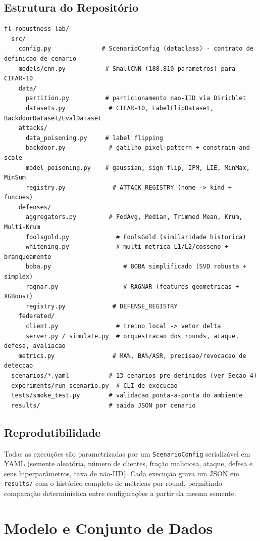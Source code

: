 \documentclass[11pt,a4paper]{article}
\begin{document}
\subsection{Estrutura do Repositório}
\begin{lstlisting}
fl-robustness-lab/
  src/
    config.py              # ScenarioConfig (dataclass) - contrato de definicao de cenario
    models/cnn.py           # SmallCNN (188.810 parametros) para CIFAR-10
    data/
      partition.py          # particionamento nao-IID via Dirichlet
      datasets.py            # CIFAR-10, LabelFlipDataset, BackdoorDataset/EvalDataset
    attacks/
      data_poisoning.py     # label flipping
      backdoor.py            # gatilho pixel-pattern + constrain-and-scale
      model_poisoning.py    # gaussian, sign flip, IPM, LIE, MinMax, MinSum
      registry.py             # ATTACK_REGISTRY (nome -> kind + funcoes)
    defenses/
      aggregators.py         # FedAvg, Median, Trimmed Mean, Krum, Multi-Krum
      foolsgold.py             # FoolsGold (similaridade historica)
      whitening.py             # multi-metrica L1/L2/cosseno + branqueamento
      boba.py                    # BOBA simplificado (SVD robusta + simplex)
      ragnar.py                  # RAGNAR (features geometricas + XGBoost)
      registry.py             # DEFENSE_REGISTRY
    federated/
      client.py                # treino local -> vetor delta
      server.py / simulate.py  # orquestracao dos rounds, ataque, defesa, avaliacao
    metrics.py                # MA%, BA%/ASR, precisao/revocacao de deteccao
  scenarios/*.yaml           # 13 cenarios pre-definidos (ver Secao 4)
  experiments/run_scenario.py  # CLI de execucao
  tests/smoke_test.py        # validacao ponta-a-ponta do ambiente
  results/                   # saida JSON por cenario
\end{lstlisting}

\subsection{Reprodutibilidade}
Todas as execuções são parametrizadas por um \texttt{ScenarioConfig} serializável em YAML (semente
aleatória, número de clientes, fração maliciosa, ataque, defesa e seus hiperparâmetros, taxa de
não-IID). Cada execução grava um JSON em \texttt{results/} com o histórico completo de métricas por
round, permitindo comparação determinística entre configurações a partir da mesma semente.

\section{Modelo e Conjunto de Dados}
\end{document}

